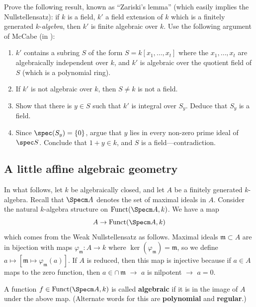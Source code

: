 \begin{exercise} 
Prove the following result, known as ``Zariski's lemma'' (which easily implies
the Nullstellensatz): if $k$ is a field, $k'$ a field extension of $k$ which
is a finitely generated $k$-\emph{algebra}, then $k'$ is finite algebraic over
$k$. Use the following argument of McCabe (in \cite{Mc76}):
\begin{enumerate}
\item $k'$ contains a subring $S$ of the form $S= k[ x_1, \dots, x_t]$ where
the $x_1, \dots, x_t$ are algebraically independent over $k$, and $k'$ is
algebraic over the quotient field of $S$ (which is a polynomial ring). 
\item  If $k'$ is not algebraic over $k$, then $S \neq k$ is not a field.
\item Show that there is $y \in S$ such that $k'$ is integral over $S_y$.
Deduce that $S_y$ is a field.
\item Since $\spec (S_y) = \left\{0\right\}$, argue that $y$ lies in every
non-zero prime ideal of $\spec S$. Conclude that $1+y \in k$, and $S$ is a
field---contradiction.
\end{enumerate}
\end{exercise} 

\subsection{A little affine algebraic geometry}

In what follows, let $k$ be algebraically closed, and let $A$ be a finitely generated $k$-algebra.  Recall that $\Specm A$ denotes the set of maximal ideals in $A$.  Consider the natural $k$-algebra structure on $\mathrm{Funct}(\Specm A, k)$.  We have a map
$$A \rightarrow \mathrm{Funct}(\Specm A, k)$$
which comes from the Weak Nullstellensatz as follows.  Maximal ideals $\mathfrak{m}\subset A$ are in bijection with maps $\varphi_\mathfrak{m}:A\rightarrow k$ where $\ker(\varphi_\mathfrak{m})=\mathfrak{m}$, so we define $a\longmapsto [\mathfrak{m}\longmapsto \varphi_\mathfrak{m}(a)]$.  If $A$ is reduced, then this map is injective because if $a\in A$ maps to the zero function, then $a\in \cap\, \mathfrak{m}$ $\rightarrow$ $a$ is nilpotent $\rightarrow$ $a=0$.\\

\begin{definition} A function $f\in \mathrm{Funct}(\Specm A,k)$ is called {\bf algebraic} if it is in the image of $A$ under the above map.  (Alternate words for this are {\bf polynomial} and {\bf regular}.) \end{definition}

